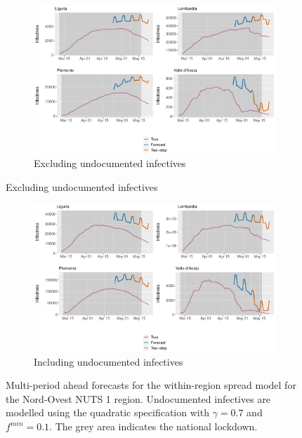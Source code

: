 \documentclass[12pt]{article}
\begin{document}
	\begin{figure}[H]
	    \centering
	    \begin{subfigure}{\textwidth}
	      \centering
	      \includegraphics[width=0.94\linewidth]{output/model_within_lag14_forecast_full_Nord-Ovest.pdf}
	      \caption{Excluding undocumented infectives}
	      \label{fig:forecast_full_within_nordovest_regular}
	    \end{subfigure}
    \end{figure}
    \begin{figure}[H]\ContinuedFloat
	    \begin{subfigure}{\textwidth}
	      \centering
	      \includegraphics[width=0.94\linewidth]{output/model_within_lag14_forecast_full_Nord-Ovest_UndocQuadratic.pdf}
	      \caption{Including undocumented infectives}
	      \label{fig:forecast_full_within_nordovest_undoc}
	    \end{subfigure}
	    \caption{Multi-period ahead forecasts for the within-region spread model for the Nord-Ovest NUTS 1 region. Undocumented infectives are modelled using the quadratic specification with $\gamma = 0.7$ and $f^{min}=0.1$. The grey area indicates the national lockdown.}
	    \label{fig:forecast_full_within_nordovest}
    \end{figure}
	
\end{document}
